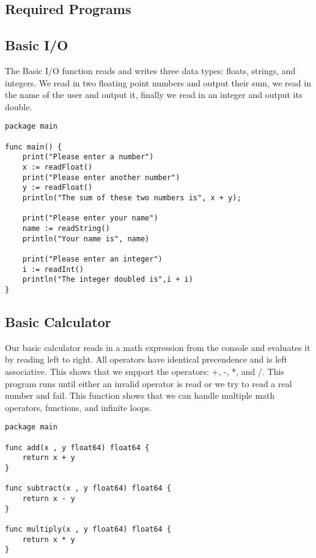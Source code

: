 \documentclass{article}
\begin{document}
\begin{appendices}

\section{Required Programs}

\subsection{Basic I/O}

The Basic I/O function reads and writes three data types: floats, strings, and integers.
We read in two floating point numbers and output their sum, we read in the name of the user and output it, finally we read in an integer and output its double.

\begin{lstlisting}[title=Basic I/O Program]
package main

func main() {
    print("Please enter a number")
    x := readFloat()
    print("Please enter another number")
    y := readFloat()
    println("The sum of these two numbers is", x + y);

    print("Please enter your name")
    name := readString()
    println("Your name is", name)

    print("Please enter an integer")
    i := readInt()
    println("The integer doubled is",i + i)
}
\end{lstlisting}

\subsection{Basic Calculator}

Our basic calculator reads in a math expression from the console and evaluates it by reading left to right.
All operators have identical precendence and is left associative.  This shows that we support the operators: +, -, *, and /. 
This program runs until either an invalid operator is read or we try to read a real number and fail.
This function shows that we can handle multiple math operators, functions, and infinite loops. 


\begin{lstlisting}[title=Basic Calculator]
package main

func add(x , y float64) float64 {
    return x + y
}

func subtract(x , y float64) float64 {
    return x - y
}

func multiply(x , y float64) float64 {
    return x * y
}


\end{lstlisting}
\end{appendices}
\end{document}
